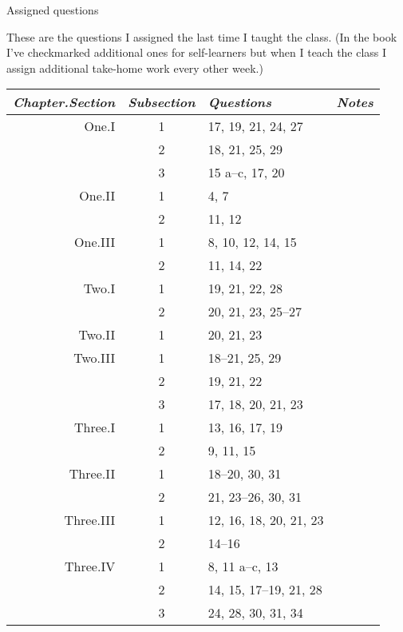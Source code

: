 \documentclass[11pt]{article}
\begin{document}
\thispagestyle{empty}
\begin{center}
\Large Assigned questions
\end{center}

These are the questions I assigned the last time I taught the class.
(In the book I've checkmarked additional ones for self-learners but
when I teach the class I assign additional take-home work every other week.)

\begin{center}
\begin{tabular}{|r|c|ll|}
\multicolumn{1}{r}{\textit{Chapter.Section}}
  &\multicolumn{1}{r}{\textit{Subsection}}
  &\textit{Questions}
  &\multicolumn{1}{l}{\textit{Notes}}      \\ \hline
One.I    &1  &17, 19, 21, 24, 27    &      \\
         &2  &18, 21, 25, 29        &      \\
         &3  &15 a--c, 17, 20       &      \\
One.II   &1  &4, 7                  &      \\
         &2  &11, 12                &      \\
One.III  &1  &8, 10, 12, 14, 15     &      \\
         &2  &11, 14, 22            &      \\ \hline
Two.I    &1  &19, 21, 22, 28        &      \\
         &2  &20, 21, 23, 25--27    &      \\
Two.II   &1  &20, 21, 23            &      \\
Two.III  &1  &18--21, 25, 29        &      \\
         &2  &19, 21, 22            &      \\
         &3  &17, 18, 20, 21, 23    &      \\ \hline
Three.I  &1  &13, 16, 17, 19        &      \\ 
         &2  &9, 11, 15             &      \\
Three.II &1  &18--20, 30, 31        &      \\
         &2  &21, 23--26, 30, 31    &      \\
Three.III&1  &12, 16, 18, 20, 21, 23&      \\
         &2  &14--16                &      \\
Three.IV &1  &8, 11 a--c, 13        &      \\
         &2  &14, 15, 17--19, 21, 28&      \\
         &3  &24, 28, 30, 31, 34    &      \\

\end{tabular}
\end{center}
\end{document}
